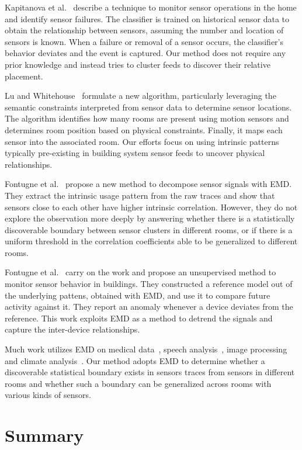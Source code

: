 Kapitanova et al.~\cite{failure} describe a technique to monitor sensor operations in the home and identify sensor failures. 
The classifier is trained on historical sensor data to obtain the relationship between sensors, assuming the number and location of 
sensors is known.  When a failure or removal of a sensor occurs, the classifier's behavior deviates and the event is captured. Our method does not require any prior knowledge and instead tries to cluster feeds to discover their relative placement.

Lu and Whitehouse~\cite{blueprints} formulate a new algorithm, particularly leveraging the semantic constraints interpreted from sensor 
data to determine sensor locations. The algorithm identifies how many rooms are present using motion sensors and determines room position based on physical constraints. Finally, it maps each sensor into the associated room. Our efforts focus on using intrinsic patterns typically pre-existing in building system sensor feeds to uncover physical relationships.

Fontugne et al.~\cite{IOT} propose a new method to decompose sensor signals with EMD.
They extract the intrinsic usage pattern from the raw traces and show that sensors close to each other have higher intrinsic correlation. However, they do not explore the observation more deeply by answering whether there is a statistically discoverable boundary between sensor clusters in different rooms, or if there is a uniform threshold in the correlation coefficients able to be generalized to different rooms.

Fontugne et al.~\cite{SBS} carry on the work and propose an unsupervised method to monitor sensor behavior in buildings. They constructed 
a reference model out of the underlying pattens, obtained with EMD,  and use it to compare future activity against it.  They report an anomaly whenever a device deviates from the reference. This work exploits EMD as a method to detrend the signals and capture the inter-device relationships.

Much work utilizes EMD on medical data~\cite{ecg}, speech analysis~\cite{speech}, image processing~\cite{ip} 
and climate analysis~\cite{climate}. Our method adopts EMD to determine whether a discoverable statistical boundary exists in sensors traces
from sensors in different rooms and whether such a boundary
 can be generalized across rooms with various kinds of sensors.


\section{Summary}






